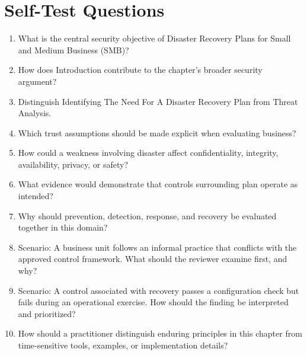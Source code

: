 \documentclass[11pt]{article}
\begin{document}
\section*{Self-Test Questions}
\begin{enumerate}
\item What is the central security objective of Disaster Recovery Plans for Small and Medium Business (SMB)?
\item How does Introduction contribute to the chapter's broader security argument?
\item Distinguish Identifying The Need For A Disaster Recovery Plan from Threat Analysis.
\item Which trust assumptions should be made explicit when evaluating business?
\item How could a weakness involving disaster affect confidentiality, integrity, availability, privacy, or safety?
\item What evidence would demonstrate that controls surrounding plan operate as intended?
\item Why should prevention, detection, response, and recovery be evaluated together in this domain?
\item Scenario: A business unit follows an informal practice that conflicts with the approved control framework. What should the reviewer examine first, and why?
\item Scenario: A control associated with recovery passes a configuration check but fails during an operational exercise. How should the finding be interpreted and prioritized?
\item How should a practitioner distinguish enduring principles in this chapter from time-sensitive tools, examples, or implementation details?
\end{enumerate}
\end{document}
